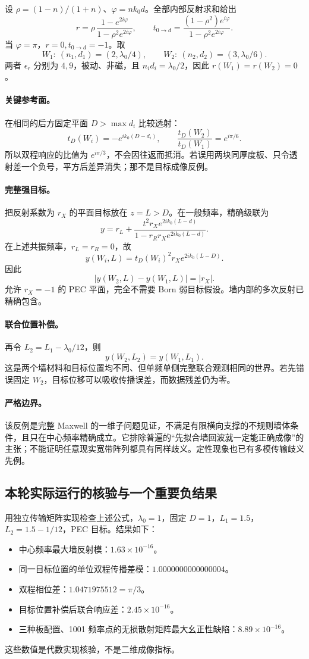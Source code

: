 设 $\rho=(1-n)/(1+n)$、$\varphi=nk_0d$。全部内部反射求和给出
\[
r=\rho\,\frac{1-e^{2i\varphi}}{1-\rho^2e^{2i\varphi}},
\qquad
t_{0\to d}=\frac{(1-\rho^2)e^{i\varphi}}
{1-\rho^2e^{2i\varphi}}.
\]
当 $\varphi=\pi$，$r=0,t_{0\to d}=-1$。取
\[
W_1:\ (n_1,d_1)=(2,\lambda_0/4),\qquad
W_2:\ (n_2,d_2)=(3,\lambda_0/6).
\]
两者 $\epsilon_r$ 分别为 $4,9$，被动、非磁，且 $n_id_i=\lambda_0/2$，因此 $r(W_1)=r(W_2)=0$。

\paragraph{关键参考面。}
在相同的后方固定平面 $D>\max d_i$ 比较透射：
\[
t_D(W_i)=-e^{ik_0(D-d_i)},\qquad
\frac{t_D(W_2)}{t_D(W_1)}=e^{i\pi/6}.
\]
所以双程响应的比值为 $e^{i\pi/3}$，不会因往返而抵消。若误用两块同厚度板、只令透射差一个负号，平方后差异消失；那不是目标成像反例。

\paragraph{完整强目标。}
把反射系数为 $r_X$ 的平面目标放在 $z=L>D$。在一般频率，精确级联为
\[
y=r_L+
\frac{t^2 r_Xe^{2ik_0(L-d)}}{1-r_Rr_Xe^{2ik_0(L-d)}}.
\]
在上述共振频率，$r_L=r_R=0$，故
\[
y(W_i,L)=t_D(W_i)^2r_Xe^{2ik_0(L-D)}.
\]
因此
\[
|y(W_2,L)-y(W_1,L)|=|r_X|.
\]
允许 $r_X=-1$ 的 PEC 平面，完全不需要 Born 弱目标假设。墙内部的多次反射已精确包含。

\paragraph{联合位置补偿。}
再令 $L_2=L_1-\lambda_0/12$，则
\[
y(W_2,L_2)=y(W_1,L_1).
\]
这是两个墙材料和目标位置均不同、但单频单侧完整联合观测相同的世界。若先错误固定 $W_2$，目标位移可以吸收传播误差，而数据残差仍为零。

\paragraph{严格边界。}
该反例是完整 Maxwell 的一维子问题见证，不满足有限横向支撑的不规则墙体条件，且只在中心频率精确成立。它排除普遍的“先拟合墙回波就一定能正确成像”的主张；不能证明任意现实宽带阵列都具有同样歧义。定性现象也已有多模传输歧义先例。\cite{L_Waagaard}

\subsection{本轮实际运行的核验与一个重要负结果}
用独立传输矩阵实现检查上述公式，$\lambda_0=1$，固定 $D=1$，$L_1=1.5$，$L_2=1.5-1/12$，PEC 目标。结果如下：
\begin{itemize}
\item 中心频率最大墙反射模：$1.63\times10^{-16}$。
\item 同一目标位置的单位双程传播差模：$1.0000000000000004$。
\item 双程相位差：$1.0471975512=\pi/3$。
\item 目标位置补偿后联合响应差：$2.45\times10^{-16}$。
\item 三种板配置、1001 频率点的无损散射矩阵最大幺正性缺陷：$8.89\times10^{-16}$。
\end{itemize}
这些数值是代数实现核验，不是二维成像指标。

